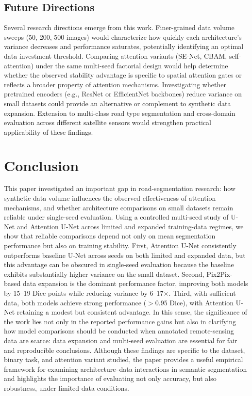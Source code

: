 \documentclass[conference]{IEEEtran}
\begin{document}
\subsection{Future Directions}

Several research directions emerge from this work. Finer-grained data volume sweeps (50, 200, 500 images) would characterize how quickly each architecture's variance decreases and performance saturates, potentially identifying an optimal data investment threshold. Comparing attention variants (SE-Net, CBAM, self-attention) under the same multi-seed factorial design would help determine whether the observed stability advantage is specific to spatial attention gates or reflects a broader property of attention mechanisms.
Investigating whether pretrained encoders (e.g., ResNet or EfficientNet backbones) reduce variance on small datasets could provide an alternative or complement to synthetic data expansion. Extension to multi-class road type segmentation and cross-domain evaluation across different satellite sensors would strengthen practical applicability of these findings.

\section{Conclusion}
\label{sec:conclusion}
This paper investigated an important gap in road-segmentation research: how synthetic data volume influences the observed effectiveness of attention mechanisms, and whether architecture comparisons on small datasets remain reliable under single-seed evaluation. Using a controlled multi-seed study of U-Net and Attention U-Net across limited and expanded training-data regimes, we show that reliable comparisons depend not only on mean segmentation performance but also on training stability. First, Attention U-Net consistently outperforms baseline U-Net across seeds on both limited and expanded data, but this advantage can be obscured in single-seed evaluation because the baseline exhibits substantially higher variance on the small dataset. Second, Pix2Pix-based data expansion is the dominant performance factor, improving both models by 15–19 Dice points while reducing variance by 6–17×. Third, with sufficient data, both models achieve strong performance ($>$0.95 Dice), with Attention U-Net retaining a modest but consistent advantage. In this sense, the significance of the work lies not only in the reported performance gains but also in clarifying how model comparisons should be conducted when annotated remote-sensing data are scarce: data expansion and multi-seed evaluation are essential for fair and reproducible conclusions. Although these findings are specific to the dataset, binary task, and attention variant studied, the paper provides a useful empirical framework for examining architecture–data interactions in semantic segmentation and highlights the importance of evaluating not only accuracy, but also robustness, under limited-data conditions.
\end{document}
